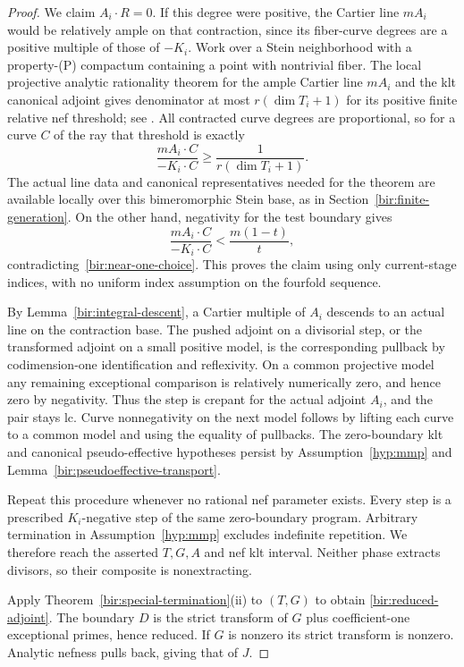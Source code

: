 \documentclass[11pt,letterpaper]{article}
\theoremstyle{definition}
\theoremstyle{remark}
\begin{document}
\begin{proof}
We claim $A_i\cdot R=0$.  If this degree were positive, the Cartier
line $mA_i$ would be relatively ample on that contraction, since
its fiber-curve degrees are a positive multiple of those of $-K_i$.
Work over a Stein neighborhood with a property-(P) compactum
containing a point with nontrivial fiber.  The local projective
analytic rationality theorem for the ample Cartier line $mA_i$
and the klt canonical adjoint gives denominator at most
$r(\dim T_i+1)$ for its positive finite relative nef threshold;
see \cite[Theorem~4.3.1 and Remark~4.3.4]{FujinoAnalyticCone}.
All contracted curve degrees are proportional, so for a curve $C$
of the ray that threshold is exactly
\begin{equation}
 \frac{mA_i\cdot C}{-K_i\cdot C}
 \geq\frac{1}{r(\dim T_i+1)}.
 \label{bir:rationality-bound}
\end{equation}
The actual line data and canonical representatives needed for the
theorem are available locally over this bimeromorphic Stein base,
as in Section~\ref{bir:finite-generation}.  On the other hand,
negativity for the test boundary gives
\[
 \frac{mA_i\cdot C}{-K_i\cdot C}
 <\frac{m(1-t)}{t},
\]
contradicting~\eqref{bir:near-one-choice}.  This proves the claim
using only current-stage indices, with no uniform index assumption
on the fourfold sequence.

By Lemma~\ref{bir:integral-descent}, a Cartier multiple of $A_i$
descends to an actual line on the contraction base.  The pushed
adjoint on a divisorial step, or the transformed adjoint on a
small positive model, is the corresponding pullback by
codimension-one identification and reflexivity.  On a common
projective model any remaining exceptional comparison is
relatively numerically zero, and hence zero by negativity.
Thus the step is crepant for the actual adjoint $A_i$, and the
pair stays lc.  Curve nonnegativity on the next model follows by
lifting each curve to a common model and using the equality of
pullbacks.  The zero-boundary klt and canonical pseudo-effective
hypotheses persist by Assumption~\ref{hyp:mmp} and
Lemma~\ref{bir:pseudoeffective-transport}.

Repeat this procedure whenever no rational nef parameter exists.
Every step is a prescribed $K_i$-negative step of the same
zero-boundary program.  Arbitrary termination in
Assumption~\ref{hyp:mmp} excludes indefinite repetition.  We
therefore reach the asserted $T,G,A$ and nef klt interval.  Neither
phase extracts divisors, so their composite is nonextracting.

Apply Theorem~\ref{bir:special-termination}(ii) to $(T,G)$ to obtain
\eqref{bir:reduced-adjoint}.  The boundary $D$ is the strict
transform of $G$ plus coefficient-one exceptional primes, hence
reduced.  If $G$ is nonzero its strict transform is nonzero.
Analytic nefness pulls back, giving that of $J$.


\end{proof}
\end{document}
